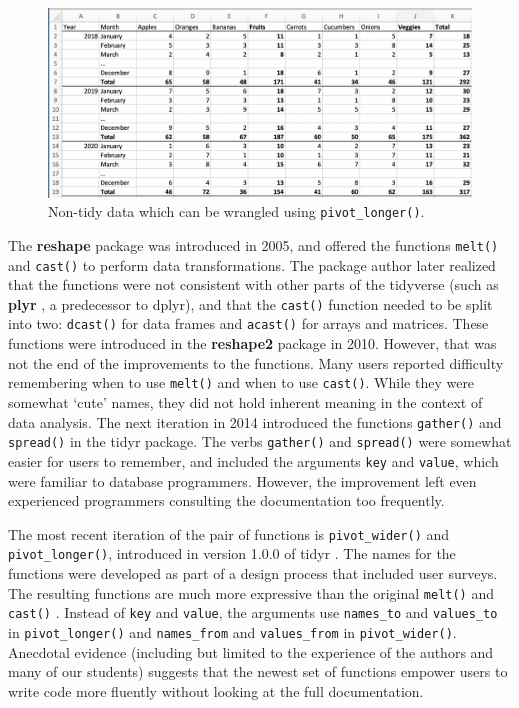 \documentclass[12pt]{article}
\begin{document}
\linespread{1}
\begin{figure}[H]

{\centering \includegraphics[width=0.95\linewidth]{images/fruitveggies} 

}

\caption{Non-tidy data which can be wrangled using \texttt{pivot\_longer()}.}\label{fig:fruitveggie}
\end{figure}\linespread{2}
\vspace{3mm}\setlength{\parindent}{15pt}

The \textbf{reshape} package \citep{R-reshape} was introduced in 2005,
and offered the functions \texttt{melt()} and \texttt{cast()} to perform
data transformations. The package author later realized that the
functions were not consistent with other parts of the tidyverse (such as
\textbf{plyr} \citep{R-plyr}, a predecessor to dplyr), and that the
\texttt{cast()} function needed to be split into two: \texttt{dcast()}
for data frames and \texttt{acast()} for arrays and matrices. These
functions were introduced in the \textbf{reshape2} \citep{R-reshape2}
package in 2010. However, that was not the end of the improvements to
the functions. Many users reported difficulty remembering when to use
\texttt{melt()} and when to use \texttt{cast()}. While they were
somewhat `cute' names, they did not hold inherent meaning in the context
of data analysis. The next iteration in 2014 introduced the functions
\texttt{gather()} and \texttt{spread()} in the tidyr \citep{R-tidyr}
package. The verbs \texttt{gather()} and \texttt{spread()} were somewhat
easier for users to remember, and included the arguments \texttt{key}
and \texttt{value}, which were familiar to database programmers.
However, the improvement left even experienced programmers consulting
the documentation too frequently.

The most recent iteration of the pair of functions is
\texttt{pivot\_wider()} and \texttt{pivot\_longer()}, introduced in
version 1.0.0 of tidyr \citep{R-tidyr}. The names for the functions were
developed as part of a design process that included user surveys. The
resulting functions are much more expressive than the original
\texttt{melt()} and \texttt{cast()} \citep{pivot-tweet}. Instead of
\texttt{key} and \texttt{value}, the arguments use \texttt{names\_to}
and \texttt{values\_to} in \texttt{pivot\_longer()} and
\texttt{names\_from} and \texttt{values\_from} in
\texttt{pivot\_wider()}. Anecdotal evidence (including but limited to
the experience of the authors and many of our students) suggests that
the newest set of functions empower users to write code more fluently
without looking at the full documentation.
\end{document}

